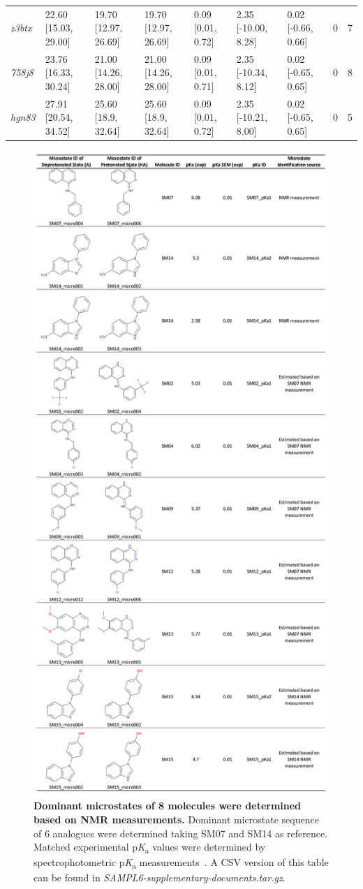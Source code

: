 \documentclass[9pt,lineno,final]{elife}
\newcommand{\pKa}{p\textit{K}\textsubscript{a}}
\begin{document}
\begin{table}[tb!]
\begin{center}
\begin{threeparttable}
\begin{tabular}{@{}lllllllll@{}}
\textit{z3btx} & 22.60 [15.03, 29.00] & 19.70 [12.97, 26.69] & 19.70 [12.97, 26.69] & 0.09 [0.01, 0.72] & 2.35 [-10.00, 8.28] & 0.02 [-0.66, 0.66] & 0 & 7 \\
\textit{758j8} & 23.76 [16.33, 30.24] & 21.00 [14.26, 28.00] & 21.00 [14.26, 28.00] & 0.09 [0.01, 0.71] & 2.35 [-10.34, 8.12] & 0.02 [-0.65, 0.65] & 0 & 8 \\
\textit{hgn83} & 27.91 [20.54, 34.52] & 25.60 [18.9, 32.64] & 25.60 [18.9, 32.64] & 0.09 [0.01, 0.72] & 2.35 [-10.21, 8.00] & 0.02 [-0.65, 0.65] & 0 & 5 \\ \bottomrule
\end{tabular}
\end{threeparttable}
\end{center}
\end{table}



\begin{figure}
\centering
\includegraphics[width=0.5\linewidth]{figures/experimental-microstates-of-8mol-based-on-NMR.png}
\caption{ {\bf Dominant microstates of 8 molecules were determined based on NMR measurements.}
Dominant microstate sequence of 6 analogues were determined taking SM07 and SM14 as reference. 
Matched experimental \pKa{} values were determined by spectrophotometric \pKa{} measurements~\citep{Isik:2018:J.Comput.AidedMol.Des.}. 
A CSV version of this table can be found in \textit{SAMPL6-supplementary-documents.tar.gz}.
}
\label{fig:experimental-microstate-IDs-SI-table}
\end{figure}
\end{document}
